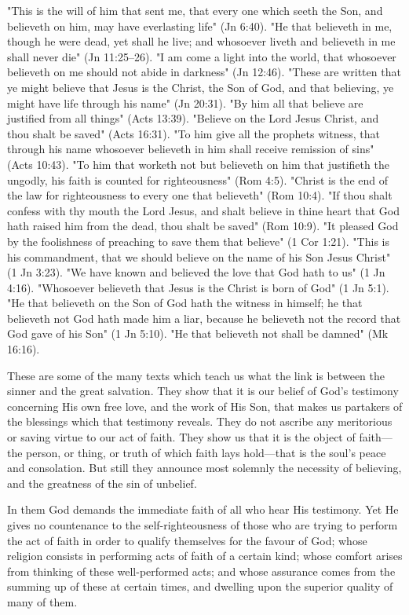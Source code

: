 \documentclass[
]{book}
\begin{document}
"This is the will of him that sent me, that every one which seeth the Son, and believeth on him, may have everlasting life" (Jn 6:40). "He that believeth in me, though he were dead, yet shall he live; and whosoever liveth and believeth in me shall never die" (Jn 11:25--26). "I am come a light into the world, that whosoever believeth on me should not abide in darkness" (Jn 12:46). "These are written that ye might believe that Jesus is the Christ, the Son of God, and that believing, ye might have life through his name" (Jn 20:31). "By him all that believe are justified from all things" (Acts 13:39). "Believe on the Lord Jesus Christ, and thou shalt be saved" (Acts 16:31). "To him give all the prophets witness, that through his name whosoever believeth in him shall receive remission of sins" (Acts 10:43). "To him that worketh not but believeth on him that justifieth the ungodly, his faith is counted for righteousness" (Rom 4:5). "Christ is the end of the law for righteousness to every one that believeth" (Rom 10:4). "If thou shalt confess with thy mouth the Lord Jesus, and shalt believe in thine heart that God hath raised him from the dead, thou shalt be saved" (Rom 10:9). "It pleased God by the foolishness of preaching to save them that believe" (1 Cor 1:21). "This is his commandment, that we should believe on the name of his Son Jesus Christ" (1 Jn 3:23). "We have known and believed the love that God hath to us" (1 Jn 4:16). "Whosoever believeth that Jesus is the Christ is born of God" (1 Jn 5:1). "He that believeth on the Son of God hath the witness in himself; he that believeth not God hath made him a liar, because he believeth not the record that God gave of his Son" (1 Jn 5:10). "He that believeth not shall be damned" (Mk 16:16).

These are some of the many texts which teach us what the link is between the sinner and the great salvation. They show that it is our belief of God's testimony concerning His own free love, and the work of His Son, that makes us partakers of the blessings which that testimony reveals. They do not ascribe any meritorious or saving virtue to our act of faith. They show us that it is the object of faith---the person, or thing, or truth of which faith lays hold---that is the soul's peace and consolation. But still they announce most solemnly the necessity of believing, and the greatness of the sin of unbelief.

In them God demands the immediate faith of all who hear His testimony. Yet He gives no countenance to the self-righteousness of those who are trying to perform the act of faith in order to qualify themselves for the favour of God; whose religion consists in performing acts of faith of a certain kind; whose comfort arises from thinking of these well-performed acts; and whose assurance comes from the summing up of these at certain times, and dwelling upon the superior quality of many of them.
\end{document}
